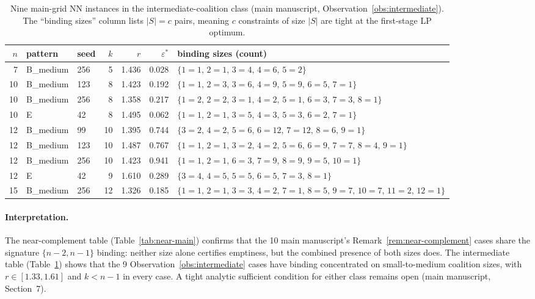 \documentclass[11pt]{article}
\theoremstyle{plain}
\theoremstyle{definition}
\theoremstyle{remark}
\begin{document}
\begin{table}[htbp]
\centering
\footnotesize
\caption{Nine main-grid NN instances in the intermediate-coalition class (main manuscript, Observation~\ref{obs:intermediate}). The ``binding sizes'' column lists $|S|=c$ pairs, meaning $c$ constraints of size $|S|$ are tight at the first-stage LP optimum.}
\label{tab:inter-binding}
\begin{tabular}{@{}rllrrrl@{}}
\toprule
$n$ & pattern & seed & $k$ & $r$ & $\varepsilon^{\ast}$ & binding sizes (count) \\
\midrule
 7 & B\_medium & 256 &  5 & 1.436 & 0.028 & $\{1{=}1,\,2{=}1,\,3{=}4,\,4{=}6,\,5{=}2\}$ \\
10 & B\_medium & 123 &  8 & 1.423 & 0.192 & $\{1{=}1,\,2{=}3,\,3{=}6,\,4{=}9,\,5{=}9,\,6{=}5,\,7{=}1\}$ \\
10 & B\_medium & 256 &  8 & 1.358 & 0.217 & $\{1{=}2,\,2{=}2,\,3{=}1,\,4{=}2,\,5{=}1,\,6{=}3,\,7{=}3,\,8{=}1\}$ \\
10 & E        &  42 &  8 & 1.495 & 0.062 & $\{1{=}1,\,2{=}1,\,3{=}5,\,4{=}3,\,5{=}3,\,6{=}2,\,7{=}1\}$ \\
12 & B\_medium &  99 & 10 & 1.395 & 0.744 & $\{3{=}2,\,4{=}2,\,5{=}6,\,6{=}12,\,7{=}12,\,8{=}6,\,9{=}1\}$ \\
12 & B\_medium & 123 & 10 & 1.487 & 0.767 & $\{1{=}1,\,2{=}1,\,3{=}2,\,4{=}2,\,5{=}6,\,6{=}9,\,7{=}7,\,8{=}4,\,9{=}1\}$ \\
12 & B\_medium & 256 & 10 & 1.423 & 0.941 & $\{1{=}1,\,2{=}1,\,6{=}3,\,7{=}9,\,8{=}9,\,9{=}5,\,10{=}1\}$ \\
12 & E        &  42 &  9 & 1.610 & 0.289 & $\{3{=}4,\,4{=}5,\,5{=}5,\,6{=}5,\,7{=}3,\,8{=}1\}$ \\
15 & B\_medium & 256 & 12 & 1.326 & 0.185 & $\{1{=}1,\,2{=}1,\,3{=}3,\,4{=}2,\,7{=}1,\,8{=}5,\,9{=}7,\,10{=}7,\,11{=}2,\,12{=}1\}$ \\
\bottomrule
\end{tabular}
\end{table}

\paragraph{Interpretation.} The near-complement table (Table~\ref{tab:near-main}) confirms that the 10 main manuscript's Remark~\ref{rem:near-complement} cases share the signature $\{n-2, n-1\}$ binding: neither size alone certifies emptiness, but the combined presence of both sizes does. The intermediate table (Table~\ref{tab:inter-binding}) shows that the 9 Observation~\ref{obs:intermediate} cases have binding concentrated on small-to-medium coalition sizes, with $r\in[1.33,1.61]$ and $k<n-1$ in every case. A tight analytic sufficient condition for either class remains open (main manuscript, Section~7).
\end{document}
